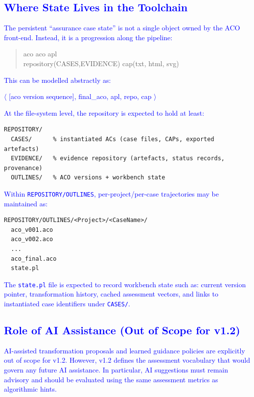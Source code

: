 \documentclass[11pt]{article}
\newcommand{\pipeline}{\textrightarrow}
\begin{document}
\subsection{\textcolor{blue}{Where State Lives in the Toolchain}}

\textcolor{blue}{The persistent ``assurance case state'' is not a single object owned by the ACO front-end. Instead, it is a progression along the pipeline:}

\begin{quote}\ttfamily\small\raggedright
aco \pipeline [ACO-WORKBENCH] \pipeline aco \pipeline [ACO-to-APL] \pipeline apl \pipeline [INSTANTIATE]\\
\pipeline repository(CASES,EVIDENCE) \pipeline [EXPORT\_AC] \pipeline cap(txt, html, svg)
\end{quote}

\textcolor{blue}{This can be modelled abstractly as:}
\begin{center}
\textcolor{blue}{$\langle$ [aco version sequence], final\_aco, apl, repo, cap $\rangle$}
\end{center}

\textcolor{blue}{At the file-system level, the repository is expected to hold at least:}
\begin{verbatim}
REPOSITORY/
  CASES/      % instantiated ACs (case files, CAPs, exported artefacts)
  EVIDENCE/   % evidence repository (artefacts, status records, provenance)
  OUTLINES/   % ACO versions + workbench state
\end{verbatim}

\textcolor{blue}{Within \texttt{REPOSITORY/OUTLINES}, per-project/per-case trajectories may be maintained as:}
\begin{verbatim}
REPOSITORY/OUTLINES/<Project>/<CaseName>/
  aco_v001.aco
  aco_v002.aco
  ...
  aco_final.aco
  state.pl
\end{verbatim}

\textcolor{blue}{The \texttt{state.pl} file is expected to record workbench state such as: current version pointer, transformation history, cached assessment vectors, and links to instantiated case identifiers under \texttt{CASES/}.}

\subsection{\textcolor{blue}{Role of AI Assistance (Out of Scope for v1.2)}}

\textcolor{blue}{AI-assisted transformation proposals and learned guidance policies are explicitly out of scope for v1.2. However, v1.2 defines the assessment vocabulary that would govern any future AI assistance. In particular, AI suggestions must remain advisory and should be evaluated using the same assessment metrics as algorithmic hints.}
\end{document}
